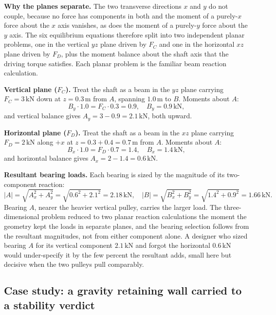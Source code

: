 

\textbf{Why the planes separate.} The two transverse directions $x$ and $y$
do not couple, because no force has components in both and the moment of a
purely-$x$ force about the $x$ axis vanishes, as does the moment of a
purely-$y$ force about the $y$ axis. The six equilibrium equations therefore
split into two independent planar problems, one in the vertical $yz$ plane
driven by $F_C$ and one in the horizontal $xz$ plane driven by $F_D$, plus
the moment balance about the shaft axis that the driving torque satisfies.
Each planar problem is the familiar beam reaction calculation.

\textbf{Vertical plane ($F_C$).} Treat the shaft as a beam in the $yz$
plane carrying $F_C = 3\,\text{kN}$ down at $z = 0.3\,\si{\meter}$ from $A$,
spanning $1.0\,\si{\meter}$ to $B$. Moments about $A$:
\[
B_y \cdot 1.0 = F_C \cdot 0.3 = 0.9, \quad B_y = 0.9\,\text{kN},
\]
and vertical balance gives $A_y = 3 - 0.9 = 2.1\,\text{kN}$, both upward.

\textbf{Horizontal plane ($F_D$).} Treat the shaft as a beam in the $xz$
plane carrying $F_D = 2\,\text{kN}$ along $+x$ at
$z = 0.3 + 0.4 = 0.7\,\si{\meter}$ from $A$. Moments about $A$:
\[
B_x \cdot 1.0 = F_D \cdot 0.7 = 1.4, \quad B_x = 1.4\,\text{kN},
\]
and horizontal balance gives $A_x = 2 - 1.4 = 0.6\,\text{kN}$.

\textbf{Resultant bearing loads.} Each bearing is sized by the magnitude of
its two-component reaction:
\[
|A| = \sqrt{A_x^2 + A_y^2} = \sqrt{0.6^2 + 2.1^2} = 2.18\,\text{kN}, \quad
|B| = \sqrt{B_x^2 + B_y^2} = \sqrt{1.4^2 + 0.9^2} = 1.66\,\text{kN}.
\]
Bearing $A$, nearer the heavier vertical pulley, carries the larger load.
The three-dimensional problem reduced to two planar reaction calculations
the moment the geometry kept the loads in separate planes, and the bearing
selection follows from the resultant magnitudes, not from either component
alone. A designer who sized bearing $A$ for its vertical component
$2.1\,\text{kN}$ and forgot the horizontal $0.6\,\text{kN}$ would
under-specify it by the few percent the resultant adds, small here but
decisive when the two pulleys pull comparably.

\subsection{Case study: a gravity retaining wall carried to a stability verdict}


